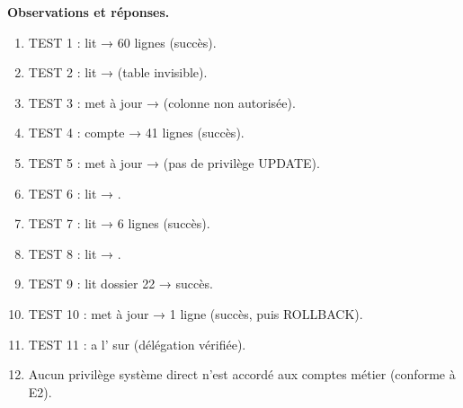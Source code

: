 \textbf{Observations et réponses.}
\begin{enumerate}
  \item TEST 1 :  lit  → 60 lignes (succès).
  \item TEST 2 :  lit  →  (table invisible).
  \item TEST 3 :  met à jour  →  (colonne non autorisée).
  \item TEST 4 :  compte  → 41 lignes (succès).
  \item TEST 5 :  met à jour  →  (pas de privilège UPDATE).
  \item TEST 6 :  lit  → .
  \item TEST 7 :  lit  → 6 lignes (succès).
  \item TEST 8 :  lit  → .
  \item TEST 9 :  lit  dossier 22 → succès.
  \item TEST 10 :  met à jour  → 1 ligne (succès, puis ROLLBACK).
  \item TEST 11 :  a l' sur  (délégation vérifiée).
  \item Aucun privilège système direct n'est accordé aux comptes métier (conforme à E2).
\end{enumerate}
